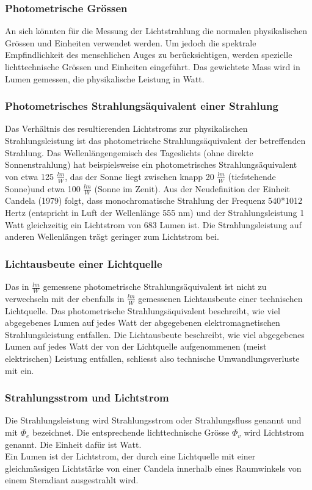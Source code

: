 \subsubsection{Photometrische Grössen}
An sich könnten für die Messung der Lichtstrahlung die normalen physikalischen Grössen und Einheiten verwendet werden. Um jedoch die spektrale Empfindlichkeit des menschlichen Auges zu berücksichtigen, werden spezielle lichttechnische Grössen und Einheiten eingeführt. Das gewichtete Mass wird in Lumen gemessen, die physikalische Leistung in Watt.

\subsubsection{Photometrisches Strahlungsäquivalent einer Strahlung}
Das Verhältnis des resultierenden Lichtstroms zur physikalischen Strahlungsleistung ist das photometrische
Strahlungsäquivalent der betreffenden Strahlung. Das Wellenlängengemisch des Tageslichts (ohne direkte Sonnenstrahlung) hat beispielsweise ein photometrisches Strahlungsäquivalent von etwa 125 $\frac{lm}{W}$, das der Sonne liegt zwischen knapp 20 $\frac{lm}{W}$ (tiefstehende Sonne)und etwa 100 $\frac{lm}{W}$ (Sonne im Zenit). Aus der Neudefinition der Einheit Candela (1979) folgt, dass monochromatische Strahlung der Frequenz 540*1012 Hertz (entspricht in Luft der Wellenlänge 555 nm) und der Strahlungsleistung 1 Watt gleichzeitig ein Lichtstrom von 683 Lumen ist. Die Strahlungsleistung auf anderen Wellenlängen trägt geringer zum Lichtstrom bei.

\subsubsection{Lichtausbeute einer Lichtquelle}
Das in $\frac{lm}{W}$ gemessene photometrische Strahlungsäquivalent ist nicht zu verwechseln mit der ebenfalls in $\frac{lm}{W}$ gemessenen Lichtausbeute einer technischen Lichtquelle. Das photometrische Strahlungsäquivalent beschreibt, wie viel abgegebenes Lumen auf jedes Watt der abgegebenen elektromagnetischen Strahlungsleistung entfallen. Die Lichtausbeute beschreibt, wie viel abgegebenes Lumen auf jedes Watt der von der Lichtquelle aufgenommenen (meist elektrischen) Leistung entfallen, schliesst also technische Umwandlungsverluste mit ein.

\subsubsection{Strahlungsstrom und Lichtstrom}
Die Strahlungsleistung wird Strahlungsstrom oder Strahlungsfluss genannt und mit $\Phi_e$ bezeichnet. Die entsprechende lichttechnische Grösse $\Phi_v$ wird Lichtstrom genannt. Die Einheit dafür ist Watt. \\
Ein Lumen ist der Lichtstrom, der durch eine Lichtquelle mit einer gleichmässigen Lichtstärke von einer Candela innerhalb eines Raumwinkels von einem Steradiant ausgestrahlt wird.

